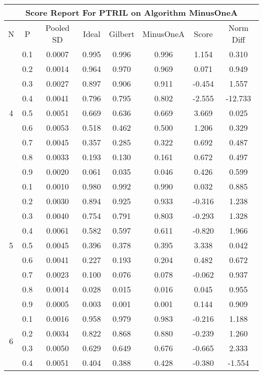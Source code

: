 \documentclass[11pt,a4paper]{report}
\begin{document}
\begin{longtable}{ | c | c || c | c | c | c | c | c | }
\hline
\multicolumn{8}{|c|}{ Score Report For PTRIL on Algorithm MinusOneA} \\
\hline
N & P & Pooled SD &  Ideal &  Gilbert & MinusOneA  & Score & Norm Diff \\
 \hline
 \hline
 \endhead
\multirow{9}{*}{4} & 0.1 & 0.0007 & 0.995 & 0.996 & 0.996 & 1.154 & 0.310 \\
 & 0.2 & 0.0014 & 0.964 & 0.970 & 0.969 & 0.071 & 0.949 \\
 & 0.3 & 0.0027 & 0.897 & 0.906 & 0.911 & -0.454 & 1.557 \\
 & 0.4 & 0.0041 & 0.796 & 0.795 & 0.802 & -2.555 & -12.733 \\
 & 0.5 & 0.0051 & 0.669 & 0.636 & 0.669 & 3.669 & 0.025 \\
 & 0.6 & 0.0053 & 0.518 & 0.462 & 0.500 & 1.206 & 0.329 \\
 & 0.7 & 0.0045 & 0.357 & 0.285 & 0.322 & 0.692 & 0.487 \\
 & 0.8 & 0.0033 & 0.193 & 0.130 & 0.161 & 0.672 & 0.497 \\
 & 0.9 & 0.0020 & 0.061 & 0.035 & 0.046 & 0.426 & 0.599 \\
 \hline
\multirow{9}{*}{5} & 0.1 & 0.0010 & 0.980 & 0.992 & 0.990 & 0.032 & 0.885 \\
 & 0.2 & 0.0030 & 0.894 & 0.925 & 0.933 & -0.316 & 1.238 \\
 & 0.3 & 0.0040 & 0.754 & 0.791 & 0.803 & -0.293 & 1.328 \\
 & 0.4 & 0.0061 & 0.582 & 0.597 & 0.611 & -0.820 & 1.966 \\
 & 0.5 & 0.0045 & 0.396 & 0.378 & 0.395 & 3.338 & 0.042 \\
 & 0.6 & 0.0041 & 0.227 & 0.193 & 0.204 & 0.482 & 0.672 \\
 & 0.7 & 0.0023 & 0.100 & 0.076 & 0.078 & -0.062 & 0.937 \\
 & 0.8 & 0.0014 & 0.028 & 0.015 & 0.016 & 0.045 & 0.955 \\
 & 0.9 & 0.0005 & 0.003 & 0.001 & 0.001 & 0.144 & 0.909 \\
 \hline
\multirow{9}{*}{6} & 0.1 & 0.0016 & 0.958 & 0.979 & 0.983 & -0.216 & 1.188 \\
 & 0.2 & 0.0034 & 0.822 & 0.868 & 0.880 & -0.239 & 1.260 \\
 & 0.3 & 0.0050 & 0.629 & 0.649 & 0.676 & -0.665 & 2.333 \\
 & 0.4 & 0.0051 & 0.404 & 0.388 & 0.428 & -0.380 & -1.554 \\

\end{longtable}
\end{document}
